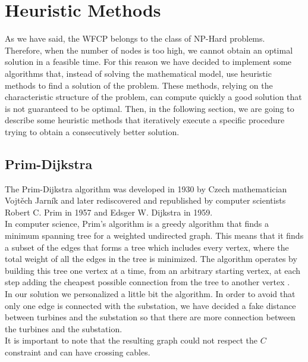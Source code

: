 
\chapter{Heuristic Methods}
\label{chp:5-Heuristic}
As we have said, the WFCP belongs to the class of NP-Hard problems. Therefore, when the number of nodes is too high, we cannot obtain an optimal solution in a feasible time.
For this reason we have decided to implement some algorithms that, instead of solving the mathematical model, use heuristic methods to find a solution of the problem. These methods, relying on the characteristic structure of the problem,  can compute  quickly a good solution that is not guaranteed to be optimal.
Then, in the following section, we are going to describe some heuristic methods that iteratively execute a specific procedure trying to obtain a consecutively better solution.
\section{Prim-Dijkstra}
The Prim-Dijkstra algorithm was developed in 1930 by Czech mathematician Vojtěch Jarník and later rediscovered and republished by computer scientists Robert C. Prim in 1957 and Edsger W. Dijkstra in 1959.\\
In computer science, Prim's algorithm is a greedy algorithm that finds a minimum spanning tree for a weighted undirected graph. This means that it finds a subset of the edges that forms a tree which includes every vertex, where the total weight of all the edges in the tree is minimized. The algorithm operates by building this tree one vertex at a time, from an arbitrary starting vertex, at each step adding the cheapest possible connection from the tree to another vertex \cite{cheriton1976finding}.\\
In our solution we personalized a little bit the algorithm. In order to avoid that only one edge is connected with the substation, we have decided a fake distance between turbines and the substation so that there are more connection between the turbines and the substation.\\
It is important to note that the resulting graph could not respect the $C$ constraint and can have crossing cables. 


